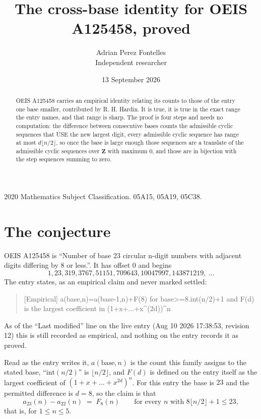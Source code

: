 \documentclass[11pt,a4paper]{article}
\title{The cross-base identity for OEIS A125458, proved}
\author{Adrian Perez Fontelles\\ \small Independent researcher}
\date{13 September 2026}
\theoremstyle{plain}
\theoremstyle{definition}
\begin{document}
\maketitle

\begin{abstract}
OEIS A125458 carries an empirical identity relating its counts to those of the entry one base
smaller, contributed by R. H. Hardin. It is true, it is true in the exact range the entry
names, and that range is sharp. The proof is four steps and needs no computation: the
difference between consecutive bases counts the admissible cyclic sequences that USE the new
largest digit, every admissible cyclic sequence has range at most $d\lfloor n/2\rfloor$, so
once the base is large enough those sequences are a translate of the admissible cyclic
sequences over $\mathbf{Z}$ with maximum $0$, and those are in bijection with the step
sequences summing to zero.
\end{abstract}

\noindent\small 2020 Mathematics Subject Classification. 05A15, 05A19, 05C38.\normalsize

\section{The conjecture}

OEIS A125458 is ``Number of base 23 circular n-digit numbers with adjacent digits differing by 8 or less.''. It has offset $0$ and begins
\[
1, 23, 319, 3767, 51151, 709643, 10047997, 143871219,\ \dots
\]
The entry states, as an empirical claim and never marked settled:
\begin{quote}
[Empirical] a(base,n)=a(base-1,n)+F(8) for base>=8.int(n/2)+1 and F(d) is the largest coefficient in (1+x+...+x\textasciicircum{}(2d))\textasciicircum{}n
\end{quote}
As of the ``Last modified'' line on the live entry (Aug 10 2026 17:38:53, revision 12)
this is still recorded as empirical, and nothing on the entry records it as proved.

Read as the entry writes it, $a(\mathrm{base},n)$ is the count this family assigns to the
stated base, ``$\mathrm{int}(n/2)$'' is $\lfloor n/2\rfloor$, and $F(d)$ is defined on the
entry itself as the largest coefficient of $(1+x+\dots+x^{2d})^{n}$. For this entry
the base is $23$ and the permitted difference is $d=8$, so the claim is that
\[
a_{23}(n)-a_{22}(n)\;=\;F_{8}(n)
\qquad\text{for every } n \text{ with } 8\lfloor n/2\rfloor+1\le23,
\]
that is, for $1\le n\le5$.
\end{document}
